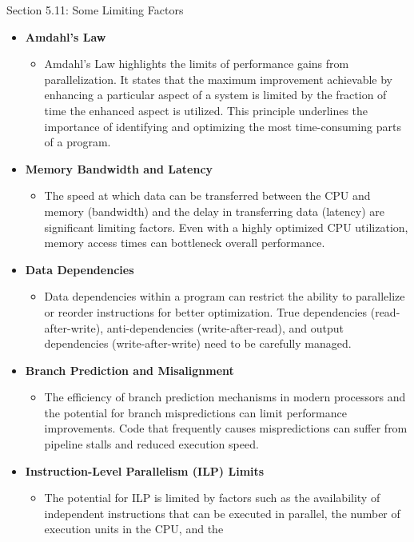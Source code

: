 \begin{notes}{Section 5.11: Some Limiting Factors}
    \begin{itemize}
        \item \textbf{Amdahl's Law}
        \begin{itemize}
            \item Amdahl's Law highlights the limits of performance gains from parallelization. It states that the maximum improvement achievable by enhancing a particular aspect of a system is limited 
            by the fraction of time the enhanced aspect is utilized. This principle underlines the importance of identifying and optimizing the most time-consuming parts of a program.
        \end{itemize}
        \item \textbf{Memory Bandwidth and Latency}
        \begin{itemize}
            \item The speed at which data can be transferred between the CPU and memory (bandwidth) and the delay in transferring data (latency) are significant limiting factors. Even with a highly 
            optimized CPU utilization, memory access times can bottleneck overall performance.
        \end{itemize}
        \item \textbf{Data Dependencies}
        \begin{itemize}
            \item Data dependencies within a program can restrict the ability to parallelize or reorder instructions for better optimization. True dependencies (read-after-write), anti-dependencies 
            (write-after-read), and output dependencies (write-after-write) need to be carefully managed.
        \end{itemize}
        \item \textbf{Branch Prediction and Misalignment}
        \begin{itemize}
            \item The efficiency of branch prediction mechanisms in modern processors and the potential for branch mispredictions can limit performance improvements. Code that frequently causes 
            mispredictions can suffer from pipeline stalls and reduced execution speed.
        \end{itemize}
        \item \textbf{Instruction-Level Parallelism (ILP) Limits}
        \begin{itemize}
            \item The potential for ILP is limited by factors such as the availability of independent instructions that can be executed in parallel, the number of execution units in the CPU, and the 

\end{itemize}
\end{itemize}
\end{notes}
